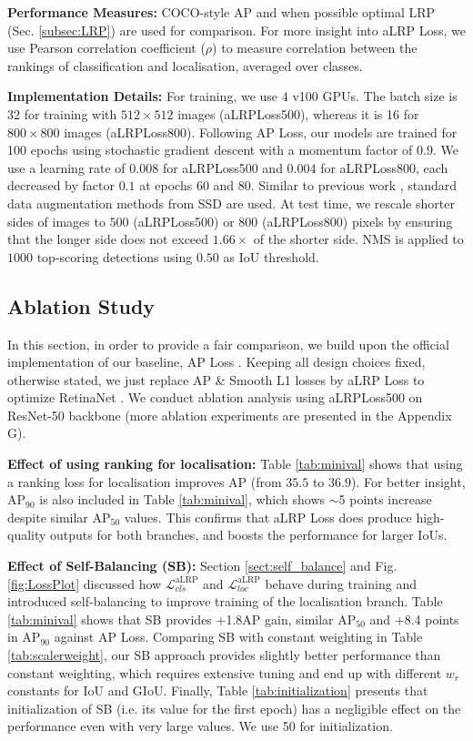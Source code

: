 \documentclass{article}
\begin{document}
\textbf{Performance Measures:} COCO-style AP \cite{COCO} and when possible optimal LRP \cite{LRP} (Sec. \ref{subsec:LRP}) are used for comparison. For more insight into aLRP Loss, we use Pearson correlation coefficient ($\rho$) to measure correlation between the rankings of classification and localisation, averaged over classes.

\textbf{Implementation Details:} For training, we use $4$ v100 GPUs. The batch size is 32 for training with $512 \times 512$ images (aLRPLoss500), whereas it is 16 for  $800 \times 800$ images (aLRPLoss800). Following AP Loss, our models are trained for 100 epochs using stochastic gradient descent with a momentum factor of $0.9$. We use a learning rate of $0.008$ for aLRPLoss500 and $0.004$ for aLRPLoss800, each decreased by factor $0.1$ at epochs 60 and 80. Similar to previous work \cite{APLoss,CenterNet}, standard data augmentation methods from SSD \cite{SSD} are used. At test time, we rescale  shorter sides of images  to $500$ (aLRPLoss500) or $800$ (aLRPLoss800) pixels by ensuring that the longer side does not exceed $1.66 \times$ of the shorter side. NMS is applied to $1000$ top-scoring detections using $0.50$ as IoU threshold.

\subsection{Ablation Study}
\label{sect:ablation}
In this section, in order to provide a fair comparison, we build upon the official implementation of our baseline, AP Loss \cite{APOfficialRepo}. Keeping all design choices fixed, otherwise stated, we just replace AP \& Smooth L1 losses by aLRP Loss to optimize RetinaNet \cite{FocalLoss}. We conduct ablation analysis using aLRPLoss500 on ResNet-50 backbone (more ablation experiments are presented in the Appendix G).

\textbf{Effect of using ranking for localisation:} Table \ref{tab:minival} shows that using a ranking loss for localisation improves AP (from $35.5$ to $36.9$). For better insight, $\mathrm{AP_{90}}$ is also included in Table \ref{tab:minival}, which shows $\sim$5 points increase  despite similar $\mathrm{AP_{50}}$ values. This confirms that aLRP Loss does produce high-quality outputs for both branches, and boosts the performance for larger IoUs.


\textbf{Effect of Self-Balancing (SB):} Section \ref{sect:self_balance} and Fig. \ref{fig:LossPlot} discussed how $\mathcal{L}^\mathrm{aLRP}_{cls}$ and $\mathcal{L}^\mathrm{aLRP}_{loc}$ behave during training and introduced self-balancing to improve training of the localisation branch. Table \ref{tab:minival} shows that SB provides +1.8AP gain, similar $\mathrm{AP}_{50}$ and +8.4 points in $\mathrm{AP}_{90}$ against AP Loss. Comparing SB with constant weighting in Table \ref{tab:scalerweight}, our SB approach provides slightly better performance than constant weighting, which requires extensive tuning and end up with different $w_r$ constants for IoU and GIoU. Finally, Table \ref{tab:initialization} presents that initialization of SB (i.e. its value for the first epoch) has a negligible effect on the performance even with very large values. We use 50 for initialization.
\end{document}
